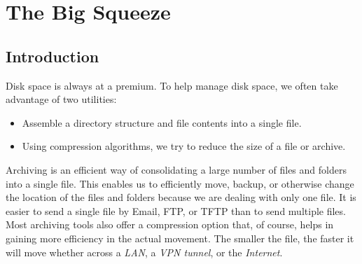 \chapter{The Big Squeeze}
\label{ch:squeeze}
\pagestyle{fancy}

\fancyhf{} %
\fancyhead[OC]{\leftmark} %
\setlength{\headheight}{13.99pt} 
\cfoot{\thepage} %


		
\section{Introduction}
Disk space is always at a premium. To help manage disk space, we often take advantage of two utilities:

\begin{itemize}
	\item {}Assemble a directory structure and file contents into a single file.
	\item {}Using compression algorithms, we try to reduce the size of a file or archive.
\end{itemize}

Archiving is an efficient way of consolidating a large number of files and folders into a single file. This enables us to efficiently move, backup, or otherwise change the location of the files and folders because we are dealing with only one file. It is easier to send a single file by Email, FTP, or TFTP than to send multiple files. Most archiving tools also offer a compression option that, of course, helps in gaining more efficiency in the actual movement. The smaller the file, the faster it will move whether across a \emph{LAN}, a \emph{VPN tunnel}, or the \emph{Internet}.

